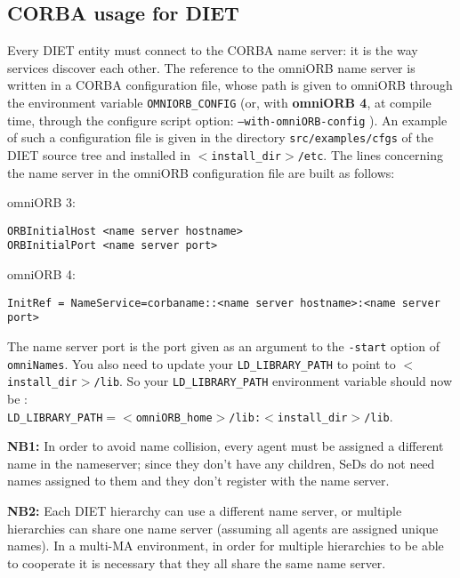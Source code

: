\subsection{CORBA usage for DIET}

Every DIET entity must connect to the CORBA name server:
it is the way services discover each other. The reference to the
omniORB name server is written in a CORBA configuration file, whose path
is given to omniORB through the environment variable
\texttt{OMNIORB\_CONFIG} (or, with \textbf{omniORB 4}, at compile
time, through the configure script option:
\texttt{--with-omniORB-config} ). An example of such a
configuration file is given in the directory
\texttt{src/examples/cfgs} of the DIET source tree and installed in
\texttt{$<$install\_dir$>$/etc}. The lines concerning the name server
in the omniORB configuration file are built as follows:
\begin{description}
 \item{omniORB 3:}
{\footnotesize
\begin{verbatim}
ORBInitialHost <name server hostname>
ORBInitialPort <name server port>
\end{verbatim}
}
 \item{omniORB 4:}
{\footnotesize
\begin{verbatim}
InitRef = NameService=corbaname::<name server hostname>:<name server
port>
\end{verbatim}
} 
\end{description}
The name server port is the port given as an argument to the
\texttt{-start} option of \texttt{omniNames}.  You also need to update
your \texttt{LD\_LIBRARY\_PATH} to point to
\texttt{$<$install\_dir$>$/lib}.  So your \texttt{LD\_LIBRARY\_PATH}
environment variable should now be :\\ \texttt{LD\_LIBRARY\_PATH$=
<$omniORB\_home$>$/lib:$<$install\_dir$>$/lib}.

\textbf{NB1:} In order to avoid name collision, every agent must be 
assigned a different name in the nameserver; since they don't have any 
children, SeDs do not need names assigned to them and they don't register with
the name server.

\textbf{NB2:} Each DIET hierarchy can use a different name server, or multiple 
hierarchies can share one name server (assuming all agents are assigned 
unique names).  In a multi-MA environment, in order for multiple hierarchies
to be able to cooperate it is necessary that they all share the same
name server.

